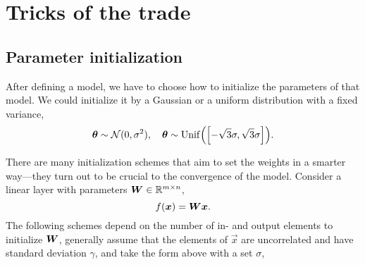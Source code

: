 \section{Tricks of the trade}

\subsection{Parameter initialization}

After defining a model, we have to choose how to initialize the parameters of that model. We could
initialize it by a Gaussian or a uniform distribution with a fixed variance, \[
    \vec{\theta} \sim \mathcal{N}(0, \sigma^2), \quad \vec{\theta} \sim \mathrm{Unif} \lft( \lft[ -\sqrt{3}\sigma, \sqrt{3}\sigma \rgt] \rgt).
\]

There are many initialization schemes that aim to set the weights in a smarter way---they turn out
to be crucial to the convergence of the model. Consider a linear layer with parameters $\bm{W} \in
    \mathbb{R}^{m \times n}$, \[
    f(\bm{x}) = \bm{W} \bm{x}.
\]
The following schemes depend on the number of in- and output elements to initialize $\bm{W}$,
generally assume that the elements of $\vec{x}$ are uncorrelated and have standard deviation
$\gamma$, and take the form above with a set $\sigma$,
